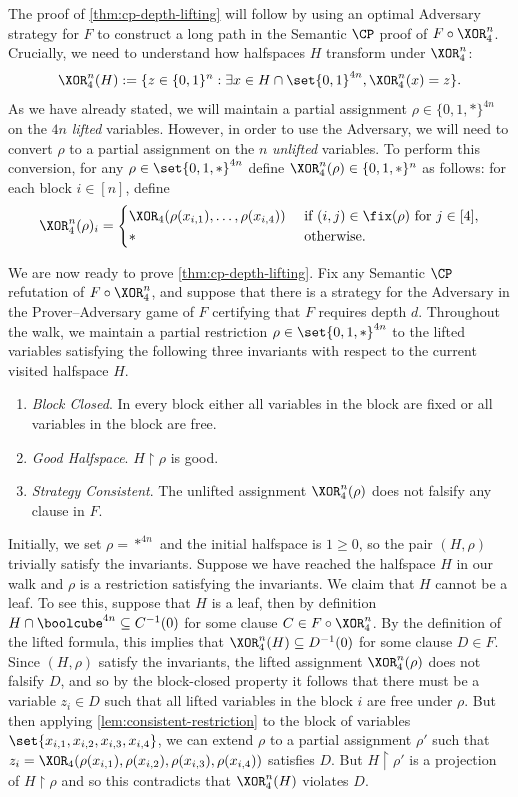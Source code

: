 The proof of \autoref{thm:cp-depth-lifting} will follow by using an optimal Adversary strategy for $F$ to construct a long path in the Semantic $\CP$ proof of $F \circ \XOR_4^n$.
Crucially, we need to understand how halfspaces $H$ transform under $\XOR_4^n$:
\[ \XOR_4^n(H):= \{z \in \{0,1\}^n : \exists x \in H \cap \set{0,1}^{4n}, \XOR^n_4(x) = z\}. \]
As we have already stated, we will maintain a partial assignment $\rho \in \{0,1,*\}^{4n}$ on the $4n$ \emph{lifted} variables.
However, in order to use the Adversary, we will need to convert $\rho$ to a partial assignment on the $n$ \emph{unlifted} variables.
To perform this conversion, for any $\rho \in \set{0,1,*}^{4n}$ define $\XOR_4^n(\rho) \in \{0,1,*\}^n$ as follows: for each block $i \in [n]$, define \[ \XOR^n_4(\rho)_i  = \begin{cases}
		\XOR_4(\rho(x_{i,1}),\ldots, \rho(x_{i, 4})) &\mbox{ if $(i,j) \in \fix(\rho)$ for $j \in [4]$}, \\
 		* &\mbox{ otherwise}.
 \end{cases}
 \]

We are now ready to prove \autoref{thm:cp-depth-lifting}.
Fix any Semantic $\CP$ refutation of $F \circ \XOR_4^n$, and suppose that there is a strategy for the Adversary in the Prover--Adversary game of $F$ certifying that $F$ requires depth $d$.
Throughout the walk, we maintain a partial restriction $\rho \in \set{0,1,*}^{4n}$ to the lifted variables satisfying the following three invariants with respect to the current visited halfspace $H$. 
\begin{enumerate}
	\item[--] \emph{Block Closed}. In every block either all variables in the block are fixed or all variables in the block are free.
	\item[--] \emph{Good Halfspace}. $H \restriction \rho$ is good.
	\item[--] \emph{Strategy Consistent}. The unlifted assignment $\XOR_4^n(\rho)$ does not falsify any clause in $F$.
\end{enumerate}
%
%
%
%
%
%
%
%
Initially, we set $\rho = *^{4n}$ and the initial halfspace is $1 \geq 0$, so the pair $(H, \rho)$ trivially satisfy the invariants.
Suppose we have reached the halfspace $H$ in our walk and $\rho$ is a restriction satisfying the invariants.
We claim that $H$ cannot be a leaf.
To see this, suppose that $H$ is a leaf, then by definition $H \cap \boolcube^{4n} \subseteq C^{-1}(0)$ for some clause $C \in F \circ \XOR^n_4$. 
By the definition of the lifted formula, this implies that $\XOR^n_4(H) \subseteq D^{-1}(0)$ for some clause $D \in F$.
Since $(H, \rho)$ satisfy the invariants, the lifted assignment $\XOR_4^n(\rho)$ does not falsify $D$, and so by the block-closed property it follows that there must be a variable $z_i \in D$ such that all lifted variables in the block $i$ are free under $\rho$.
But then applying \autoref{lem:consistent-restriction} to the block of variables $\set{x_{i,1}, x_{i,2}, x_{i,3}, x_{i,4}}$, we can extend $\rho$ to a partial assignment $\rho'$ such that $z_i = \XOR_4(\rho(x_{i,1}), \rho(x_{i,2}), \rho(x_{i,3}), \rho(x_{i,4}))$ satisfies $D$.
But $H \restriction \rho'$ is a projection of $H \restriction \rho$ and so this contradicts that $\XOR^n_4(H)$ violates $D$.

